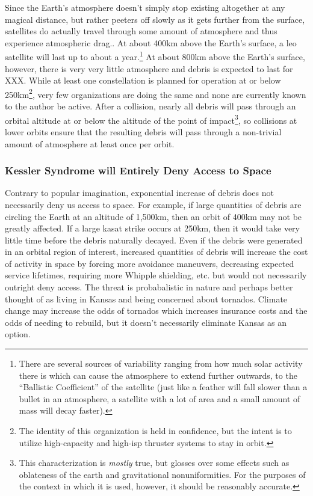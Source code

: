 Since the Earth's atmosphere doesn't simply stop existing altogether
at any magical distance, but rather peeters off slowly as it gets
further from the surface, satellites do actually travel through some
amount of atmosphere and thus experience atmospheric drag.\cite[good
  survey of orbit decay]{xxx}.  At about 400km above the Earth's
surface, a \ac{leo} satellite will last up to about a
year.\footnote{There are several sources of variability ranging from
how much solar activity there is which can cause the atmosphere to
extend further outwards, to the ``Ballistic Coefficient'' of the
satellite (just like a feather will fall slower than a bullet in an
atmosphere, a satellite with a lot of area and a small amount of mass
will decay faster).}\cite[probably same survey]{xxx} At about 800km
above the Earth's surface, however, there is very very little
atmosphere and debris is expected to last for XXX.\cite[analysis of
  fengyun using the dread model]{xxx} While at least one constellation
is planned for operation at or below 250km\footnote{The identity of
this organization is held in confidence, but the intent is to utilize
high-capacity and high-isp thruster systems to stay in orbit.}, very
few organizations are doing the same and none are currently known to
the author be active.  After a collision, nearly all debris will pass
through an orbital altitude at or below the altitude of the point of
impact\footnote{This characterization is \emph{mostly} true, but
glosses over some effects such as oblateness of the earth and
gravitational nonuniformities.  For the purposes of the context in
which it is used, however, it should be reasonably accurate.}, so
collisions at lower orbits ensure that the resulting debris will pass
through a non-trivial amount of atmosphere at least once per orbit.

\subsubsection{Kessler Syndrome will Entirely Deny Access to Space}
Contrary to popular imagination, exponential increase of debris does
not necessarily deny us access to space.  For example, if large
quantities of debris are circling the Earth at an altitude of 1,500km,
then an orbit of 400km may not be greatly affected.  If a large
\ac{kasat} strike occurs at 250km, then it would take very little time
before the debris naturally decayed.  Even if the debris were
generated in an orbital region of interest, increased quantities of
debris will increase the cost of activity in space by forcing more
avoidance maneuvers, decreasing expected service lifetimes, requiring
more Whipple shielding, etc. but would not necessarily outright deny
access.  The threat is probabalistic in nature and perhaps better
thought of as living in Kansas and being concerned about tornados.
Climate change may increase the odds of tornados which increases
insurance costs and the odds of needing to rebuild, but it doesn't
necessarily eliminate Kansas as an option.

